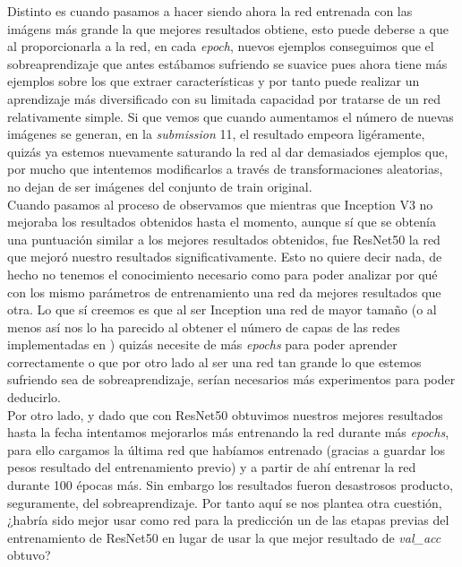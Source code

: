Distinto es cuando pasamos a hacer  siendo ahora la red entrenada con las imágens más grande la que mejores resultados obtiene, esto puede deberse a que al proporcionarla a la red, en cada \textit{epoch}, nuevos ejemplos conseguimos que el sobreaprendizaje que antes estábamos sufriendo se suavice pues ahora tiene más ejemplos sobre los que extraer características y por tanto puede realizar un aprendizaje más diversificado con su limitada capacidad por tratarse de un red relativamente simple. Si que vemos que cuando aumentamos el número de nuevas imágenes se generan, en la \textit{submission} 11, el resultado empeora ligéramente, quizás ya estemos nuevamente saturando la red al dar demasiados ejemplos que, por mucho que intentemos modificarlos a través de transformaciones aleatorias, no dejan de ser imágenes del conjunto de train original.\\

Cuando pasamos al proceso de  observamos que mientras que Inception V3 no mejoraba los resultados obtenidos hasta el momento, aunque sí que se obtenía una puntuación similar a los mejores resultados obtenidos, fue ResNet50 la red que mejoró nuestro resultados significativamente. Esto no quiere decir nada, de hecho no tenemos el conocimiento necesario como para poder analizar por qué con los mismo parámetros de entrenamiento una red da mejores resultados que otra. Lo que sí creemos es que al ser Inception una red de mayor tamaño (o al menos así nos lo ha parecido al obtener el número de capas de las redes implementadas en ) quizás necesite de más \textit{epochs} para poder aprender correctamente o que por otro lado al ser una red tan grande lo que estemos sufriendo sea de sobreaprendizaje, serían necesarios más experimentos para poder deducirlo.\\

Por otro lado, y dado que con ResNet50 obtuvimos nuestros mejores resultados hasta la fecha intentamos mejorarlos más entrenando la red durante más \textit{epochs}, para ello cargamos la última red que habíamos entrenado (gracias a guardar los pesos resultado del entrenamiento previo) y a partir de ahí entrenar la red durante 100 épocas más. Sin embargo los resultados fueron desastrosos producto, seguramente, del sobreaprendizaje. Por tanto aquí se nos plantea otra cuestión, ¿habría sido mejor usar como red para la predicción un de las etapas previas del entrenamiento de ResNet50 en lugar de usar la que mejor resultado de \textit{val\_acc} obtuvo?\\

